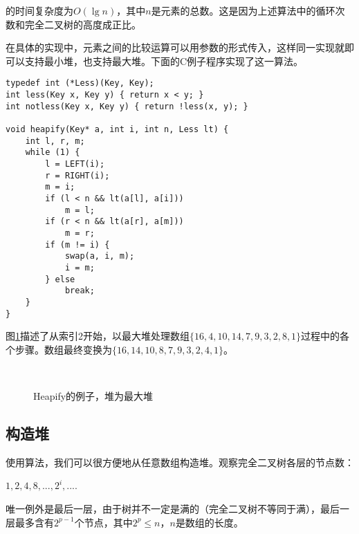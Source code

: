 \documentclass[UTF8]{article}
\begin{document}
的时间复杂度为$O(\lg n)$，其中$n$是元素的总数。这是因为上述算法中的循环次数和完全二叉树的高度成正比。

在具体的实现中，元素之间的比较运算可以用参数的形式传入，这样同一实现就即可以支持最小堆，也支持最大堆。下面的C例子程序实现了这一算法。

\begin{lstlisting}
typedef int (*Less)(Key, Key);
int less(Key x, Key y) { return x < y; }
int notless(Key x, Key y) { return !less(x, y); }

void heapify(Key* a, int i, int n, Less lt) {
    int l, r, m;
    while (1) {
        l = LEFT(i);
        r = RIGHT(i);
        m = i;
        if (l < n && lt(a[l], a[i]))
            m = l;
        if (r < n && lt(a[r], a[m]))
            m = r;
        if (m != i) {
            swap(a, i, m);
            i = m;
        } else
            break;
    }
}
\end{lstlisting}

图\ref{fig:heapify}描述了从索引2开始，以最大堆处理数组$\{16, 4, 10, 14, 7, 9, 3, 2, 8, 1\}$过程中的各个步骤。数组最终变换为$\{16, 14, 10, 8, 7, 9, 3, 2, 4, 1\}$。

\begin{figure}[htbp]
    \centering
     \hspace{0.01\textwidth}
     \\
    \caption{Heapify的例子，堆为最大堆} \label{fig:heapify}
\end{figure}


\subsection{构造堆}

使用算法，我们可以很方便地从任意数组构造堆。观察完全二叉树各层的节点数：

$1, 2, 4, 8, ..., 2^i, ...$.

唯一例外是最后一层，由于树并不一定是满的（完全二叉树不等同于满），最后一层最多含有$2^{p-1}$个节点，其中$2^p \leq n$，$n$是数组的长度。
\end{document}
